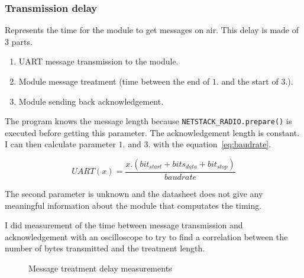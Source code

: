 
\subsubsection{Transmission delay}

Represents the time for the module to get messages on air. 
This delay is made of 3 parts.

\begin{enumerate}
  \item UART message transmission to the module.
  \item Module message treatment (time between the end of $1.$ and the start of $3.$).
  \item Module sending back acknowledgement.
\end{enumerate}

The program knows the message length because
\lstinline{NETSTACK_RADIO.prepare()} is executed before getting this parameter.
The acknowledgement length is constant. 
I can then calculate parameter $1.$ and $3.$ with the equation~\ref{eq:baudrate}.

\begin{equation}
  \label{eq:baudrate}
  UART(x) = \frac{x . (bit_{start} + bits_{data} + bit_{stop})}{baudrate}
\end{equation}

The second parameter is unknown and the datasheet does not give any meaningful
information about the module that computates the timing.

I did measurement of the time between message transmission and acknowledgement
with an oscilloscope to try to find a correlation between the number of bytes
transmitted and the treatment length.

\begin{figure}[H]
  \centering


  \caption{Message treatment delay measurements\label{fig:transmissiondelay}}
\end{figure}

